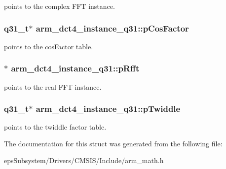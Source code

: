 points to the complex F\-F\-T instance. \hypertarget{structarm__dct4__instance__q31_af97204d1838925621fc82021a0c2d6c1}{
\subsubsection[{p\-Cos\-Factor}]{\setlength{\rightskip}{0pt plus 5cm}q31\-\_\-t$\ast$ arm\-\_\-dct4\-\_\-instance\-\_\-q31\-::p\-Cos\-Factor}}\label{structarm__dct4__instance__q31_af97204d1838925621fc82021a0c2d6c1}
points to the cos\-Factor table. \hypertarget{structarm__dct4__instance__q31_af1487dab5e7963b85dc0fdc6bf492542}{
\subsubsection[{p\-Rfft}]{$\ast$ arm\-\_\-dct4\-\_\-instance\-\_\-q31\-::p\-Rfft}}\label{structarm__dct4__instance__q31_af1487dab5e7963b85dc0fdc6bf492542}
points to the real F\-F\-T instance. \hypertarget{structarm__dct4__instance__q31_a7db236e22673146bb1d2c962f0713f08}{
\subsubsection[{p\-Twiddle}]{\setlength{\rightskip}{0pt plus 5cm}q31\-\_\-t$\ast$ arm\-\_\-dct4\-\_\-instance\-\_\-q31\-::p\-Twiddle}}\label{structarm__dct4__instance__q31_a7db236e22673146bb1d2c962f0713f08}
points to the twiddle factor table. 

The documentation for this struct was generated from the following file\-:\begin{DoxyCompactItemize}
\item 
eps\-Subsystem/\-Drivers/\-C\-M\-S\-I\-S/\-Include/arm\-\_\-math.\-h\end{DoxyCompactItemize}
